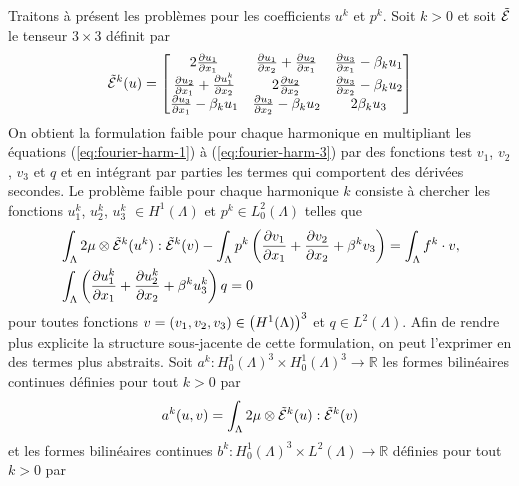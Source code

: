 Traitons à présent les problèmes pour les coefficients $u^k$ et
$p^k$. Soit $k > 0$ et soit $\tilde {\mathcal E}$ le tenseur $3\times
3$ définit par
\begin{equation}
  \tilde{\mathcal E}^k(u) = \begin{bmatrix}
     2\frac{\partial u_1}{\partial x_1}
    & \frac{\partial u_1}{\partial x_2} + \frac{\partial u_2}{\partial x_1}
    & \frac{\partial u_3}{\partial x_1} - \beta_k u_1 \\
       \frac{\partial u_2}{\partial x_1} + \frac{\partial u_1^k}{\partial x_2}
    & 2\frac{\partial u_2}{\partial x_2}
    &  \frac{\partial u_3}{\partial x_2} - \beta_k u_2 \\
       \frac{\partial u_3}{\partial x_1} - \beta_k u_1
    &  \frac{\partial u_3}{\partial x_2} - \beta_k u_2
    & 2\beta_k u_3
  \end{bmatrix}
\end{equation}
On obtient la formulation faible pour chaque harmonique en multipliant
les équations (\ref{eq:fourier-harm-1}) à (\ref{eq:fourier-harm-3})
par des fonctions test $v_1$, $v_2$, $v_3$ et $q$ et en intégrant par
parties les termes qui comportent des dérivées secondes. Le problème
faible pour chaque harmonique $k$ consiste à chercher les fonctions
$u_1^k$, $u_2^k$, $u_3^k$ $\in H^1(\Lambda)$ et $p^k\in
L^2_0(\Lambda)$ telles que
\begin{align}
  &\int_\Lambda 2\mu\otimes\tilde{\mathcal E}^k(u^k):\tilde{\mathcal E}^k(v)
  - \int_\Lambda p^k\left( \frac{\partial v_1}{\partial x_1} +
    \frac{\partial v_2}{\partial x_2} + \beta^k v_3 \right)
  = \int_\Lambda f^k\cdot v,\label{eq:fourier-weak-harm-1}\\
  &\int_\Lambda \left( \frac{\partial u_1^k}{\partial x_1} + \frac{\partial u_2^k}{\partial x_2} + \beta^k u_3^k \right)q = 0\label{eq:fourier-weak-harm-2}
\end{align}
pour toutes fonctions $v = (v_1,v_2,v_3)\in \left( H^1(\Lambda) \right)^3$ et $q\in
L^2(\Lambda)$. Afin de rendre plus explicite la structure sous-jacente
de cette formulation, on peut l'exprimer en des termes plus
abstraits. Soit $a^k:H^1_0(\Lambda)^3\times H^1_0(\Lambda)^3 \to \mathbb
R$ les formes bilinéaires continues définies pour tout $k > 0$ par
\begin{equation}
  a^k(u,v) = \int_\Lambda
  2\mu\otimes\tilde{\mathcal E}^k(u):\tilde{\mathcal E}^k(v)
\end{equation}
et les formes bilinéaires continues $b^k:H^1_0(\Lambda)^3\times L^2(\Lambda)\to\mathbb
R$ définies pour tout $k > 0$ par
